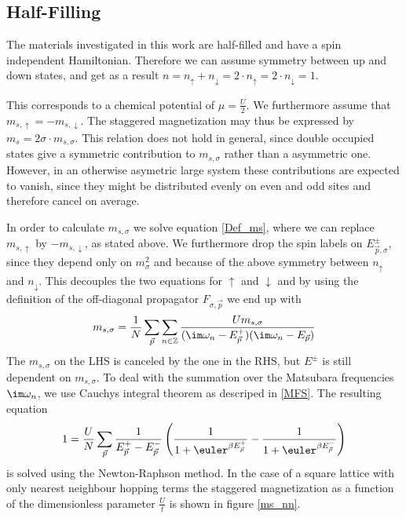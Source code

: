 \documentclass[a4paper,10pt]{report}
\begin{document}
\subsection{Half-Filling}

The materials investigated in this work are half-filled and have a spin independent Hamiltonian.
Therefore we can assume symmetry between up and down states, and get as a result
$n=n_{\uparrow}+n_{\downarrow}=2\cdot n_{\uparrow}= 2\cdot n_{\downarrow} = 1$.

This corresponds to a chemical potential of 
$\mu=\frac{U}2$.
We furthermore assume that $m_{s,\uparrow}=-m_{s,\downarrow}$. 
The staggered magnetization may thus be expressed by $m_s=2\sigma \cdot m_{s,\sigma}$.
This relation does not hold in general, since double occupied states give a symmetric contribution to $m_{s,\sigma}$ rather than a asymmetric one.
However, in an otherwise asymetric large system these contributions are expected to vanish, since they might be distributed evenly on even and odd sites 
and therefore cancel on average.

In order to calculate $m_ {s,\sigma}$ we solve equation \ref{Def_ms}, where we can replace $m_{s,\uparrow}$ by $-m_{s,\downarrow}$, as stated above.
We furthermore drop the spin labels on $E_{\vec p,\sigma}^{\pm}$, since they depend only on $m_{\sigma}^2$ and because of the above symmetry between $n_{\uparrow}$ and $n_{\downarrow}$.
This decouples the two equations for $\uparrow$ and $\downarrow$ and by using the definition of the off-diagonal propagator $F_{\sigma,\vec{p}}$ we end up with
\begin{equation}
 m_{s,\sigma} = \frac1N \sum_{\vec{p}} \sum_{n\in \mathbb{Z}} 
							      \frac { Um_{s,\sigma} }
								    { (\im \omega_n - E_{\vec{p}}^+) (\im \omega_n - E_{\vec{p}})}
\end{equation}
The $m_{s,\sigma}$ on the LHS is canceled by the one in the RHS, but $E^{\pm}$ is still dependent on $m_{s,\sigma}$.
To deal with the summation over the Matsubara frequencies $\im \omega_n$, we use Cauchys integral theorem as descriped in \ref{MFS}.
The resulting equation
\begin{equation}
 1= \frac{U}{N}\sum_{\vec{p}} \frac{1}{E_{\vec p}^+ - E_{\vec{p}}^-} \left( \frac{1}{1+\euler^{\beta E_{\vec p}^+}} - \frac{1}{1+\euler^{\beta E_{\vec p}^-}} \right)
\end{equation}
is solved using the Newton-Raphson method.
In the case of a square lattice with only nearest neighbour hopping terms the staggered magnetization as a function of the dimensionless parameter $\frac{U}{t}$ is shown in figure
\ref{ms_nn}.
\end{document}
